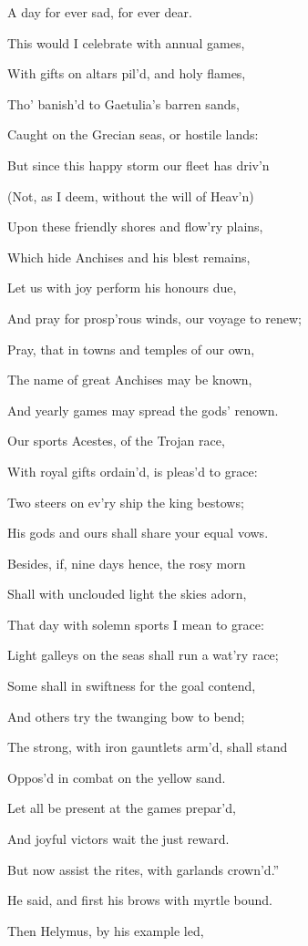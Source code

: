 A day for ever sad, for ever dear.

This would I celebrate with annual games,

With gifts on altars pil’d, and holy flames,

Tho’ banish’d to Gaetulia’s barren sands,

Caught on the Grecian seas, or hostile lands:

But since this happy storm our fleet has driv’n

(Not, as I deem, without the will of Heav’n)

Upon these friendly shores and flow’ry plains,

Which hide Anchises and his blest remains,

Let us with joy perform his honours due,

And pray for prosp’rous winds, our voyage to renew;

Pray, that in towns and temples of our own,

The name of great Anchises may be known,

And yearly games may spread the gods’ renown.

Our sports Acestes, of the Trojan race,

With royal gifts ordain’d, is pleas’d to grace:

Two steers on ev’ry ship the king bestows;

His gods and ours shall share your equal vows.

Besides, if, nine days hence, the rosy morn

Shall with unclouded light the skies adorn,

That day with solemn sports I mean to grace:

Light galleys on the seas shall run a wat’ry race;

Some shall in swiftness for the goal contend,

And others try the twanging bow to bend;

The strong, with iron gauntlets arm’d, shall stand

Oppos’d in combat on the yellow sand.

Let all be present at the games prepar’d,

And joyful victors wait the just reward.

But now assist the rites, with garlands crown’d.”

He said, and first his brows with myrtle bound.

Then Helymus, by his example led,

